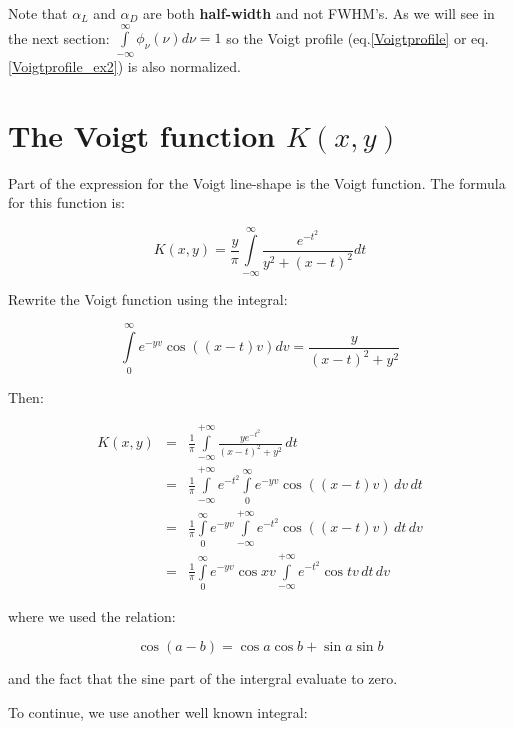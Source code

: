 \documentclass[10pt,a4paper]{report}
\begin{document}
\begin{flushleft}
{\begin{minipage}{\linewidth}
 \end{minipage}
}

\vspace{5 mm}
Note that $\alpha_L$ and $\alpha_D$ are both {\bf half-width} and not FWHM's.
As we will see in the next section: 
$ \int\limits_{-\infty}^\infty {\phi_\nu(\nu)d\nu} = 1 $
so the Voigt profile (eq.\ref{Voigtprofile} or eq.\ref{Voigtprofile_ex2}) is also normalized.



\section{The Voigt function $K(x,y)$} 

Part of the expression for the Voigt line-shape is the Voigt function.
The formula for this function is:

\[
K(x,y) = \frac{y}{\pi} {\int\limits_{- \infty} ^{\infty}} \frac{e^{-t^{2}}}{y^2 + {(x - t)}^2} dt
\]

Rewrite the Voigt function using the integral:

\begin{displaymath}
\int\limits_{0}^{\infty}
e^{-yv}\cos{\left( (x-t)v\right)}dv = 
\frac{y}{(x-t)^2+y^2}
\end{displaymath}

Then:

\begin{eqnarray*} 
K(x,y) &=& 
\frac{1}{\pi}
\int\limits_{-{\infty}}^{+{\infty}}
\frac{ye^{-t^2}}{(x-t)^2+y^2}\,dt\\
&=&
\frac{1}{\pi}
\int\limits_{-{\infty}}^{+{\infty}}
e^{-t^2}
\int\limits_{0}^{\infty}
e^{-yv}\cos{\left((x-t)v \right)}\,dv\,dt\\
&=&
\frac{1}{\pi}
\int\limits_{0}^{\infty}
e^{-yv}
\int\limits_{-{\infty}}^{+{\infty}}
e^{-t^2}\cos{\left( (x-t)v\right)}\, dt\,dv\\
&=&
\frac{1}{\pi}
\int\limits_{0}^{\infty}
e^{-yv} \cos{xv}
\int\limits_{-{\infty}}^{+{\infty}}
e^{-t^2}\cos{tv}\, dt\,dv
\end{eqnarray*}  

where we used the relation:

\begin{displaymath}
\cos(a-b) = \cos a\cos b + \sin a \sin b
\end{displaymath}

and the fact that the sine part of the intergral evaluate to zero.

To continue, we use another well known integral:
 


\end{flushleft}
\end{document}
